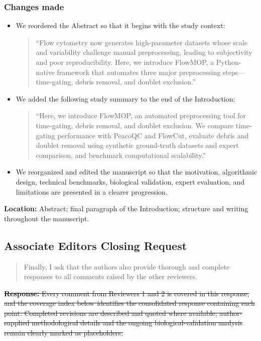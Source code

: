 \documentclass[
  11pt,
  a4paper,
]{article}
\begin{document}
\subsubsection{Changes made}\label{changes-made-15}

\begin{itemize}
\item
  We reordered the Abstract so that it begins with the study context:

  \begin{quote}
  ``Flow cytometry now generates high-parameter datasets whose scale and
  variability challenge manual preprocessing, leading to subjectivity
  and poor reproducibility. Here, we introduce FlowMOP, a Python-native
  framework that automates three major preprocessing
  steps---time-gating, debris removal, and doublet exclusion.''
  \end{quote}
\item
  We added the following study summary to the end of the Introduction:

  \begin{quote}
  ``Here, we introduce FlowMOP, an automated preprocessing tool for
  time-gating, debris removal, and doublet exclusion. We compare
  time-gating performance with PeacoQC and FlowCut, evaluate debris and
  doublet removal using synthetic ground-truth datasets and expert
  comparison, and benchmark computational scalability.''
  \end{quote}
\item
  We reorganized and edited the manuscript so that the motivation,
  algorithmic design, technical benchmarks, biological validation,
  expert evaluation, and limitations are presented in a clearer
  progression.
\end{itemize}

\textbf{Location:} Abstract; final paragraph of the Introduction;
structure and writing throughout the manuscript.

\subsection{Associate Editor\textquotesingle s Closing
Request}\label{associate-editors-closing-request}

\begin{quote}
Finally, I ask that the authors also provide thorough and complete
responses to all comments raised by the other reviewers.
\end{quote}

{\color{revisionred}\sout{\textbf{Response:} Every comment from
Reviewers 1 and 2 is covered in this response, and the coverage index
below identifies the consolidated response containing each point.
Completed revisions are described and quoted where available;
author-supplied methodological details and the ongoing
biological-validation analysis remain clearly marked as placeholders.}}
\end{document}
